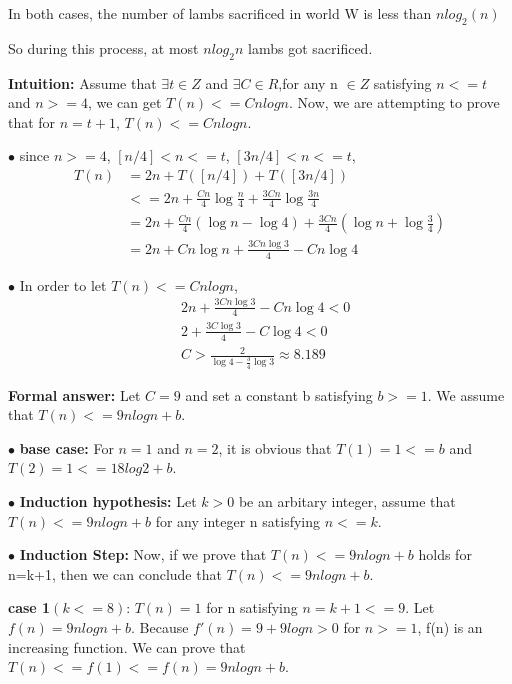 \documentclass[12pt,a4paper]{article}
\newcommand{\question}[1]{\bigskip\noindent{\textbf{Q{#1} solution}}}
\begin{document}
In both cases, the number of lambs sacrificed in world W is less than $nlog_2(n)$

So during this process, at most $nlog_2n$ lambs got sacrificed.

\question{3.A}

\noindent %
	\textbf{Intuition:}
	{Assume that $\exists t \in Z$ and $\exists C \in R$,for any n $\in Z$ satisfying $n<=t$ and $n>=4$, we can get $T(n)<=Cnlogn$. Now, we are attempting to prove that for $n=t+1$, $T(n)<=Cnlogn$.}%

		$\bullet$ since $n>=4$, $[n/4]<n<=t$, $[3n/4]<n<=t$,
		\begin{align*}
 		T(n)&=2n+T([n/4])+T([3n/4]) \\
		&<=2n + \frac{Cn}{4} \log{\frac{n}{4}} + \frac{3Cn}{4} \log{ \frac{3n}{4}}\\
		&= 2n + \frac{Cn}{4}(\log{n}-\log{4}) + \frac{3Cn}{4} ({ \log{n}+\log{\frac{3}{4}}})\\
		&= 2n + Cn\log{n} + \frac{3Cn\log{3}}{4} - Cn\log{4}
		\end{align*}
		
		$\bullet$ In order to let $T(n)<=Cnlogn$,
		\begin{align*}
 		&2n + \frac{3Cn\log{3}}{4} - Cn\log{4} <0 \\
		&2 + \frac{3C\log{3}}{4} - C\log{4} <0 \\
		&C > \frac{2}{\log{4}-\frac{3}{4}\log{3}}\approx 8.189
		\end{align*}
		
	\noindent
	\textbf{Formal answer:}
	{Let $C=9$ and set a constant b satisfying $b>=1$.  We assume that $T(n)<=9nlogn+b$}.

		$\bullet$ \textbf{base case:}
		For $n=1$ and $n=2$, it is obvious that $T(1)=1<=b$ and $T(2)=1<=18log2+b$.


		$\bullet$ \textbf{Induction hypothesis:}
		Let $k>0$ be an arbitary integer, assume that $T(n)<=9nlogn+b$ for any integer n satisfying $n<=k$.

		
		$\bullet$ \textbf{Induction Step:}
		Now, if we prove that $T(n)<=9nlogn+b$ holds for n=k+1, then we can conclude that $T(n)<=9nlogn+b$.


		
		\textbf{case 1$(k<=8)$}:
		$T(n)=1$ for n satisfying $n=k+1<=9$. Let $f(n)=9nlogn+b$. Because $f'(n)=9+9logn>0$ for $n>=1$, f(n) is an increasing function. We can prove that $T(n)<=f(1)<=f(n)=9nlogn+b$.
\end{document}
